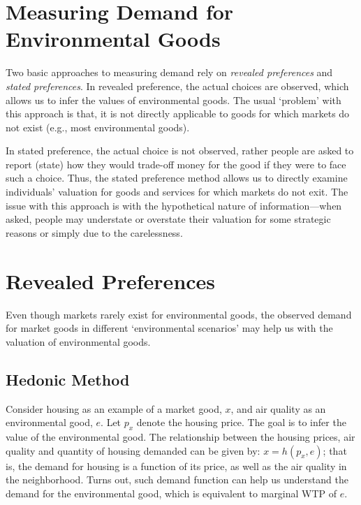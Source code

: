 \documentclass[
]{book}
\begin{document}
\hypertarget{measuring-demand-for-environmental-goods}{%
\section{Measuring Demand for Environmental Goods}\label{measuring-demand-for-environmental-goods}}

Two basic approaches to measuring demand rely on \emph{revealed preferences} and \emph{stated preferences}. In revealed preference, the actual choices are observed, which allows us to infer the values of environmental goods. The usual `problem' with this approach is that, it is not directly applicable to goods for which markets do not exist (e.g., most environmental goods).

In stated preference, the actual choice is not observed, rather people are asked to report (state) how they would trade-off money for the good if they were to face such a choice. Thus, the stated preference method allows us to directly examine individuals' valuation for goods and services for which markets do not exit. The issue with this approach is with the hypothetical nature of information---when asked, people may understate or overstate their valuation for some strategic reasons or simply due to the carelessness.

\hypertarget{revealed-preferences}{%
\section{Revealed Preferences}\label{revealed-preferences}}

Even though markets rarely exist for environmental goods, the observed demand for market goods in different `environmental scenarios' may help us with the valuation of environmental goods.

\hypertarget{hedonic-method}{%
\subsection{Hedonic Method}\label{hedonic-method}}

Consider housing as an example of a market good, \(x\), and air quality as an environmental good, \(e\). Let \(p_x\) denote the housing price. The goal is to infer the value of the environmental good. The relationship between the housing prices, air quality and quantity of housing demanded can be given by: \(x=h(p_x,e)\); that is, the demand for housing is a function of its price, as well as the air quality in the neighborhood. Turns out, such demand function can help us understand the demand for the environmental good, which is equivalent to marginal WTP of \(e\).
\end{document}
